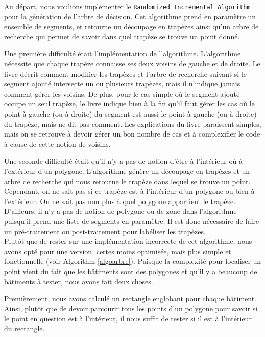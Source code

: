 Au départ, nous voulions implémenter le \texttt{Randomized Incremental Algorithm} pour la génération de l'arbre de décision. Cet algorithme prend en paramètre un ensemble de segments, et retourne un découpage en trapèzes ainsi qu'un arbre de recherche qui permet de savoir dans quel trapèze se trouve un point donné.

Une première difficulté était l'implémentation de l'algorithme. L'algorithme nécessite que chaque trapèze connaisse ses deux voisins de gauche et de droite. Le livre décrit comment modifier les trapèzes et l'arbre de recherche suivant si le segment ajouté intersecte un ou plusieurs trapèzes, mais il n'indique jamais comment gérer les voisins. De plus, pour le cas simple où le segment ajouté occupe un seul trapèze, le livre indique bien à la fin qu'il faut gérer les cas où le point à gauche (ou à droite) du segment est aussi le point à gauche (ou à droite) du trapèze, mais ne dit pas comment. Les explications du livre paraissent simples, mais on se retrouve à devoir gérer un bon nombre de cas et à complexifier le code à cause de cette notion de voisins.

Une seconde difficulté était qu'il n'y a pas de notion d'être à l'intérieur où à l'extérieur d'un polygone. L'algorithme génère un découpage en trapèzes et un arbre de recherche qui nous retourne le trapèze dans lequel se trouve un point. Cependant, on ne sait pas si ce trapèze est à l'intérieur d'un polygone ou bien à l'extérieur. On ne sait pas non plus à quel polygone appartient le trapèze. D'ailleurs, il n'y a pas de notion de polygone ou de zone dans l'algorithme puisqu'il prend une liste de segments en paramètre. Il est donc nécessaire de faire un pré-traitement ou post-traitement pour labéliser les trapèzes.\\

Plutôt que de rester sur une implémentation incorrecte de cet algorithme, nous avons opté pour une version, certes moins optimisée, mais plus simple et fonctionnelle (voir Algorithm \ref{algoarbre}). Puisque la complexité pour localiser un point vient du fait que les bâtiments sont des polygones et qu'il y a beaucoup de bâtiments à tester, nous avons fait deux choses.

Premièrement, nous avons calculé un rectangle englobant pour chaque bâtiment. Ainsi, plutôt que de devoir parcourir tous les points d'un polygone pour savoir si le point en question est à l'intérieur, il nous suffit de tester si il est à l'intérieur du rectangle.

